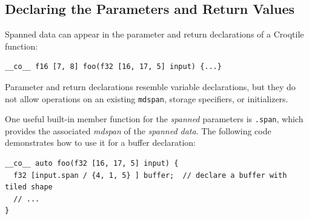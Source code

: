 \subsection*{Declaring the Parameters and Return Values}

Spanned data can appear in the parameter and return declarations of a Croqtile function:

\begin{lstlisting}[language=croqtile,caption={An explicit return shape}]
__co__ f16 [7, 8] foo(f32 [16, 17, 5] input) {...}
\end{lstlisting}

Parameter and return declarations resemble variable declarations, but they do not allow operations on an existing \texttt{mdspan}, storage specifiers, or initializers.

One useful built-in member function for the \emph{spanned} parameters is \texttt{.span}, which provides the associated \emph{mdspan} of the \emph{spanned data}. The following code demonstrates how to use it for a buffer declaration:

\begin{lstlisting}[language=croqtile,caption={A deduced return shape}]
__co__ auto foo(f32 [16, 17, 5] input) {
  f32 [input.span / {4, 1, 5} ] buffer;  // declare a buffer with tiled shape
  // ...
}
\end{lstlisting}
